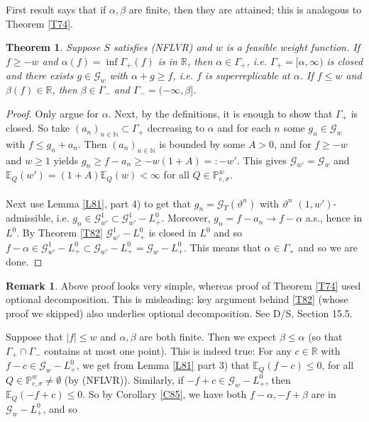 \documentclass[12pt,a4paper, twoside]{article}
\newtheorem{thm}{Theorem}[section]
\theoremstyle{definition}
\newtheorem{rem}{Remark}[section]
\newcommand{\EE}{\mathbb{E}} %
\newcommand{\PP}{\mathbb{P}} %
\begin{document}
First result says that if $\alpha, \beta$ are finite, then they are attained; this is analogous to Theorem \ref{T74}.
\begin{thm}\label{T91} Suppose $S$ satisfies (NFLVR) and $w$ is a feasible weight function. If $f \geq -w$ and $\alpha(f) = \inf \Gamma_+(f)$ is in $\mathbb{R}$, then $\alpha \in \Gamma_+$, i.e. $\Gamma_+=[ \alpha, \infty)$ is closed and there exists $g \in \mathcal{G}_w$ with $\alpha + g \geq f$, i.e. $f$ is superreplicable at $\alpha$. If $f \leq w$ and $\beta(f) \in \mathbb{R}$, then $\beta \in \Gamma_-$ and $\Gamma_-= (- \infty, \beta]$. 
\end{thm}
\begin{proof}
Only argue for $\alpha$. Next, by the definitions, it is enough to show that $\Gamma_+$ is closed. So take $( a_n)_{n \in \mathbb{N}} \subset \Gamma_+$ decreasing to $\alpha$ and for each $n$ some $g_n \in \mathcal{G}_w$ with $f \leq g_n + a_n$. Then $(a_n)_{n \in \mathbb{N}}$ is bounded by some $A>0$, and for $f \geq -w$ and $w \geq 1$ yields $g_n \geq f- a_n \geq -w(1+A)=:-w'$. This gives $\mathcal{G}_{w'} = \mathcal{G}_w$ and $\EE_Q(w') =(1+A) \EE_Q(w) < \infty$ for all $Q \in \PP_{e, \sigma}^w$. \\
\\
Next use Lemma \ref{L81}, part 4) to get that $g_n = \mathcal{G}_T( \vartheta^n)$ with $\vartheta^n$ $(1,w')$-admissible, i.e. $g_n \in \mathcal{G}_{w'}^1 \subset \mathcal{G}_{w'}^1-L_+^0$. Moreover, $g_n = f-a_n \to f- \alpha$ a.s., hence in $L^0$. By Theorem \ref{T82} $\mathcal{G}_{w'}^1-L_+^0$ is closed in $L^0$ and so $f- \alpha \in \mathcal{G}_{w' }^1-L_+^0 \subset \mathcal{G}_{w'}-L_+^0= \mathcal{G}_w-L_+^0$. This means that $\alpha \in \Gamma_+$ and so we are done. 
\end{proof}
\begin{rem} Above proof looks very simple, whereas proof of Theorem \ref{T74} used optional decomposition. This is misleading: key argument behind \ref{T82} (whose proof we skipped) also underlies optional decomposition. See D/S, Section 15.5.
\end{rem}
Suppose that $|f| \leq w$ and $\alpha, \beta$ are both finite. Then we expect $\beta \leq \alpha$ (so that $\Gamma_+ \cap \Gamma_-$ contains at most one point). This is indeed true: For any $c \in \mathbb{R}$ with $f-c \in \mathcal{G}_w-L_+^0$, we get from Lemma \ref{L81} part 3) that $\EE_Q(f-c) \leq 0$, for all $Q \in \PP_{e, \sigma}^w \neq \emptyset$ (by (NFLVR)). Similarly,  if $-f + c \in \mathcal{G}_w- L_+^0$, then $\EE_Q(-f+c) \leq 0$. So by Corollary \ref{C85}, we have both $f- \alpha, -f+ \beta$ are in $\mathcal{G}_w-L_+^0$, and so 
\end{document}
